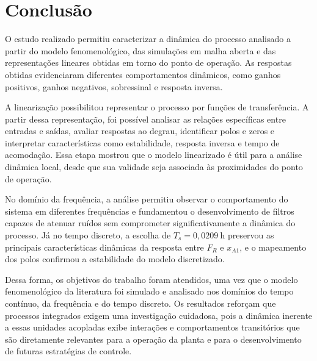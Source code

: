 \section{Conclusão}

O estudo realizado permitiu caracterizar a dinâmica do processo analisado a partir do modelo fenomenológico, das simulações em malha aberta e das representações lineares obtidas em torno do ponto de operação.
As respostas obtidas evidenciaram diferentes comportamentos dinâmicos, como ganhos positivos, ganhos negativos, sobressinal e resposta inversa.

A linearização possibilitou representar o processo por funções de transferência.
A partir dessa representação, foi possível analisar as relações específicas entre entradas e saídas, avaliar respostas ao degrau, identificar polos e zeros e interpretar características como estabilidade, resposta inversa e tempo de acomodação.
Essa etapa mostrou que o modelo linearizado é útil para a análise dinâmica local, desde que sua validade seja associada às proximidades do ponto de operação.

No domínio da frequência, a análise permitiu observar o comportamento do sistema em diferentes frequências e fundamentou o desenvolvimento de filtros capazes de atenuar ruídos sem comprometer significativamente a dinâmica do processo.
Já no tempo discreto, a escolha de $T_s = 0{,}0209 \ \mathrm{h}$ preservou as principais características dinâmicas da resposta entre $F_R$ e $x_{A1}$, e o mapeamento dos polos confirmou a estabilidade do modelo discretizado.

Dessa forma, os objetivos do trabalho foram atendidos, uma vez que o modelo fenomenológico da literatura foi simulado e analisado nos domínios do tempo contínuo, da frequência e do tempo discreto.
Os resultados reforçam que processos integrados exigem uma investigação cuidadosa, pois a dinâmica inerente a essas unidades acopladas exibe interações e comportamentos transitórios que são diretamente relevantes para a operação da planta e para o desenvolvimento de futuras estratégias de controle.

